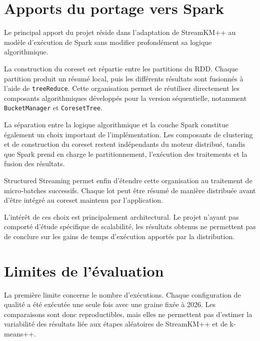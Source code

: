 \section{Apports du portage vers Spark}

Le principal apport du projet réside dans l'adaptation de StreamKM++ au modèle d'exécution de Spark sans modifier profondément sa logique algorithmique.

La construction du coreset est répartie entre les partitions du RDD. Chaque partition produit un résumé local, puis les différents résultats sont fusionnés à l'aide de \texttt{treeReduce}. Cette organisation permet de réutiliser directement les composants algorithmiques développés pour la version séquentielle, notamment \texttt{BucketManager} et \texttt{CoresetTree}.

La séparation entre la logique algorithmique et la couche Spark constitue également un choix important de l'implémentation. Les composants de clustering et de construction du coreset restent indépendants du moteur distribué, tandis que Spark prend en charge le partitionnement, l'exécution des traitements et la fusion des résultats.

Structured Streaming permet enfin d'étendre cette organisation au traitement de micro-batches successifs. Chaque lot peut être résumé de manière distribuée avant d'être intégré au coreset maintenu par l'application.

L'intérêt de ces choix est principalement architectural. Le projet n'ayant pas comporté d'étude spécifique de scalabilité, les résultats obtenus ne permettent pas de conclure sur les gains de temps d'exécution apportés par la distribution.

\section{Limites de l'évaluation}

La première limite concerne le nombre d'exécutions. Chaque configuration de qualité a été exécutée une seule fois avec une graine fixée à 2026. Les comparaisons sont donc reproductibles, mais elles ne permettent pas d'estimer la variabilité des résultats liée aux étapes aléatoires de StreamKM++ et de k-means++.

